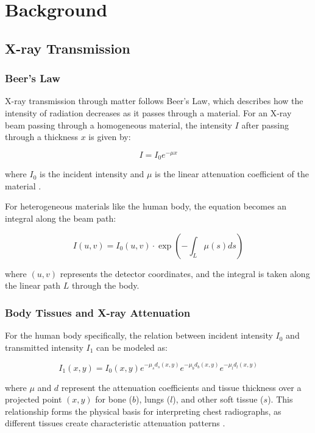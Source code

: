 \documentclass[nomenclature, english, bibtex]{kththesis}
\numberwithin{listing}{chapter}
\begin{document}
\chapter{Background}

\section{X-ray Transmission}
\subsection{Beer's Law}
X-ray transmission through matter follows Beer's Law, which describes how the intensity of radiation decreases as it passes through a material. For an X-ray beam passing through a homogeneous material, the intensity $I$ after passing through a thickness $x$ is given by:

\begin{equation}
I = I_0 e^{-\mu x}
\end{equation}

where $I_0$ is the incident intensity and $\mu$ is the linear attenuation coefficient of the material \cite[p.~35]{cullity2014elements}.

For heterogeneous materials like the human body, the equation becomes an integral along the beam path:

\begin{equation}
I(u,v) = I_0(u,v) \cdot \exp\left(-\int_L \mu(s)ds\right)
\end{equation}

where $(u,v)$ represents the detector coordinates, and the integral is taken along the linear path $L$ through the body.

\subsection{Body Tissues and X-ray Attenuation}
For the human body specifically, the relation between incident intensity $I_0$ and transmitted intensity $I_1$ can be modeled as:

\begin{equation}
I_1(x, y) = I_0(x, y) e^{-\mu_s d_s(x,y)} e^{-\mu_b d_b(x,y)} e^{-\mu_l d_l(x, y)}
\end{equation}

where $\mu$ and $d$ represent the attenuation coefficients and tissue thickness over a projected point $(x,y)$ for bone ($b$), lungs ($l$), and other soft tissue ($s$). This relationship forms the physical basis for interpreting chest radiographs, as different tissues create characteristic attenuation patterns \cite{prokop2003principles}.
\end{document}
